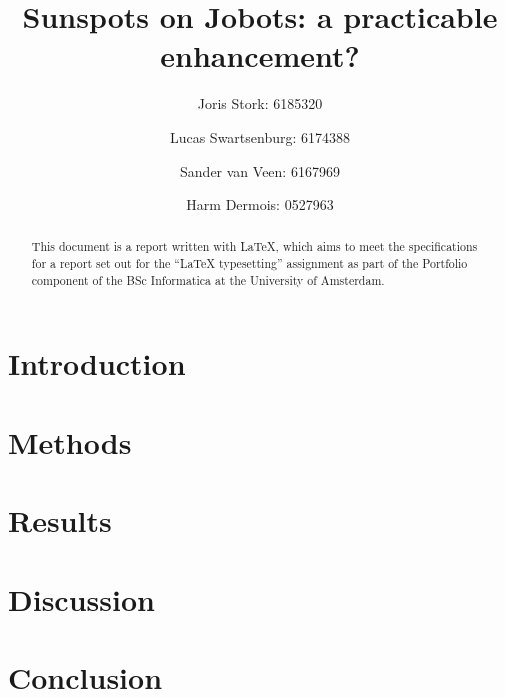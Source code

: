 \documentclass[a4paper, 12pt, titlepage]{article}
\author{Joris Stork: 6185320 \and Lucas Swartsenburg: 6174388 \and Sander van
Veen: 6167969 \and Harm Dermois: 0527963}
\title{Sunspots on Jobots: a practicable enhancement?}
\begin{document}
\maketitle
\tableofcontents
\newpage

\begin{abstract}
This document is a report written with \LaTeX{}, which aims to meet the
specifications for a report set out for the ``\LaTeX{} typesetting'' assignment 
as part of the Portfolio component of the BSc Informatica at the University 
of Amsterdam.
\end{abstract}

\section{Introduction}

\section{Methods}

\section{Results}

\section{Discussion}

\section{Conclusion}



\end{document}
